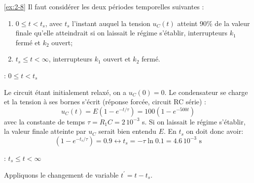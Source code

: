 \begin{solexercise}{\ref{ex:2-8}}
	\label{solex:2-8}
Il faut consid\'erer les deux p\'eriodes temporelles suivantes :
\begin{enumerate}
	\item $0\leq t < t_s$, avec $t_s$ l'instant auquel la tension $u_C(t)$ atteint 90\% de la
	valeur finale qu'elle atteindrait si on laissait le r\'egime
	s'\'etablir, interrupteurs $k_1$ ferm\'e et $k_2$ ouvert;
	\item $t_s\leq t < \infty$, interrupteurs $k_1$ ouvert et $k_2$ ferm\'e.
\end{enumerate}
  : $0\leq t < t_s$

Le circuit \'etant initialement relax\'e, on a $u_C(0)=0$. Le condensateur
se charge et la tension \`a ses  bornes s'\'ecrit (r\'eponse forc\'ee, circuit
RC s\'erie) :
\[u_C(t)=E(1-e^{-t/\tau})=100(1-e^{-500 t})\]
avec la constante de temps $\tau=R_1C=2\, 10^{-3}$ s.
Si on laissait le r\'egime s'\'etablir, la valeur finale atteinte par
$u_C$ serait bien entendu $E$. En $t_s$ on doit donc avoir:
\[(1-e^{-t_s/\tau})=0.9 \leftrightarrow t_s=-\tau\ln 0.1 = 4.6\,
10^{-3}\text{~s}\]

  : $t_s\leq t < \infty$

Appliquons le changement de variable $t^{'}=t-t_s$.


\end{solexercise}
